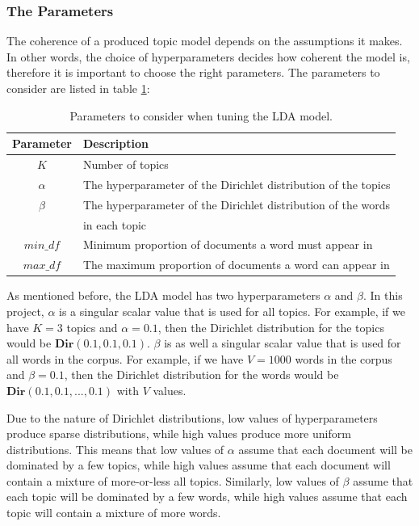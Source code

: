 \subsubsection*{The Parameters}

The coherence of a produced topic model depends on the assumptions it makes. In other words, the choice of hyperparameters decides how coherent the model is, therefore it is important to choose the right parameters. The parameters to consider are listed in table \ref{tab:parameters}:

\begin{table}[h]
    \centering
    \begin{tabular}{cl}
        \hline
        Parameter & Description \\
        \hline
        $K$ & Number of topics \\
        $\alpha$ & The hyperparameter of the Dirichlet distribution of the topics\\
        $\beta$ & The hyperparameter of the Dirichlet distribution of the words  \\
          &  in each topic \\
        $min\_df$ & Minimum proportion of documents a word must appear in \\
        $max\_df$ & The maximum proportion of documents a word can appear in \\
\end{tabular}
    \caption{Parameters to consider when tuning the LDA model.}
    \label{tab:parameters}
\end{table}

As mentioned before, the LDA model has two hyperparameters $\alpha$ and $\beta$. In this project, $\alpha$ is a singular scalar value that is used for all topics. For example, if we have $K=3$ topics and $\alpha=0.1$, then the Dirichlet distribution for the topics would be $\textbf{Dir}(0.1, 0.1, 0.1)$. $\beta$ is as well a singular scalar value that is used for all words in the corpus. For example, if we have $V=1000$ words in the corpus and $\beta=0.1$, then the Dirichlet distribution for the words would be $\textbf{Dir}(0.1, 0.1, ..., 0.1)$ with $V$ values.

Due to the nature of Dirichlet distributions, low values of hyperparameters produce sparse distributions, while high values produce more uniform distributions. This means that low values of $\alpha$ assume that each document will be dominated by a few topics, while high values assume that each document will contain a mixture of more-or-less all topics. Similarly, low values of $\beta$ assume that each topic will be dominated by a few words, while high values assume that each topic will contain a mixture of more words.

